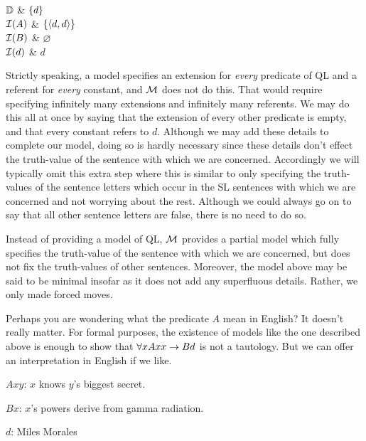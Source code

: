 \begin{partialmodel}
  $\mathbb{D}$			& $\lbrace d\rbrace$\\
	$\mathcal{I}(A)$ 	& $\lbrace\langle d,d\rangle\rbrace$\\
  $\mathcal{I}(B)$	  & $\varnothing$\\
	$\mathcal{I}(d)$	  & $d$
\end{partialmodel}

Strictly speaking, a model specifies an extension for \textit{every} predicate of QL and a referent for \textit{every} constant, and $\mathcal{M}$ does not do this.
That would require specifying infinitely many extensions and infinitely many referents.
We may do this all at once by saying that the extension of every other predicate is empty, and that every constant refers to $d$.
Although we may add these details to complete our model, doing so is hardly necessary since these details don't effect the truth-value of the sentence with which we are concerned.
Accordingly we will typically omit this extra step where this is similar to only specifying the truth-values of the sentence letters which occur in the SL sentences with which we are concerned and not worrying about the rest.
Although we could always go on to say that all other sentence letters are false, there is no need to do so.

Instead of providing a model of QL, $\mathcal{M}$ provides a partial model which fully specifies the truth-value of the sentence with which we are concerned, but does not fix the truth-values of other sentences.
Moreover, the model above may be said to be minimal insofar as it does not add any superfluous details.
Rather, we only made forced moves.

Perhaps you are wondering what the predicate $A$ mean in English?
It doesn't really matter.
For formal purposes, the existence of models like the one described above is enough to show that $\forall x Axx \rightarrow Bd$ is not a tautology.
But we can offer an interpretation in English if we like.

\begin{ekey}
  \item[$Axy$:] $x$ knows $y$'s biggest secret.
  \item[$Bx$:] $x$'s powers derive from gamma radiation.
  \item[$d$:] Miles Morales
\end{ekey}


